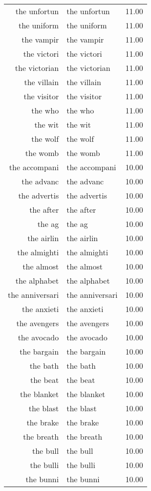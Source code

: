 \begin{table}[ht]
\begin{tabular}{rlr}
  the unfortun & the unfortun & 11.00 \\ 
  the uniform & the uniform & 11.00 \\ 
  the vampir & the vampir & 11.00 \\ 
  the victori & the victori & 11.00 \\ 
  the victorian & the victorian & 11.00 \\ 
  the villain & the villain & 11.00 \\ 
  the visitor & the visitor & 11.00 \\ 
  the who & the who & 11.00 \\ 
  the wit & the wit & 11.00 \\ 
  the wolf & the wolf & 11.00 \\ 
  the womb & the womb & 11.00 \\ 
  the accompani & the accompani & 10.00 \\ 
  the advanc & the advanc & 10.00 \\ 
  the advertis & the advertis & 10.00 \\ 
  the after & the after & 10.00 \\ 
  the ag & the ag & 10.00 \\ 
  the airlin & the airlin & 10.00 \\ 
  the almighti & the almighti & 10.00 \\ 
  the almost & the almost & 10.00 \\ 
  the alphabet & the alphabet & 10.00 \\ 
  the anniversari & the anniversari & 10.00 \\ 
  the anxieti & the anxieti & 10.00 \\ 
  the avengers & the avengers & 10.00 \\ 
  the avocado & the avocado & 10.00 \\ 
  the bargain & the bargain & 10.00 \\ 
  the bath & the bath & 10.00 \\ 
  the beat & the beat & 10.00 \\ 
  the blanket & the blanket & 10.00 \\ 
  the blast & the blast & 10.00 \\ 
  the brake & the brake & 10.00 \\ 
  the breath & the breath & 10.00 \\ 
  the bull & the bull & 10.00 \\ 
  the bulli & the bulli & 10.00 \\ 
  the bunni & the bunni & 10.00 \\ 

\end{tabular}
\end{table}

